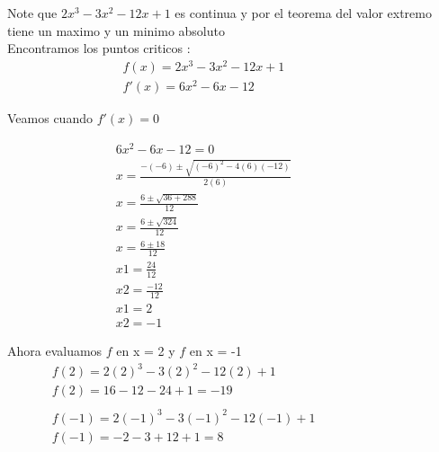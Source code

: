 \documentclass{report}
\begin{document}
{\Large\justify

Note que $ 2x^3 -3x^2 -12x + 1$ es continua y por el teorema del valor extremo
tiene un maximo y un minimo absoluto \\
Encontramos los puntos criticos :
\begin{align*}
     & f(x) = 2x^3 -3x^2 -12x + 1 &  &  &  &  &  &  & \\
     & f'(x) = 6x^2 -6x -12
\end{align*}

Veamos cuando $f'(x) = 0$

\begin{align*}                                    
     & 6x^2 -6x -12 = 0                                      &  &  &  &  &  &  & \\
     & x = \frac{ -(-6) \pm \sqrt{(-6)^2 -4(6)(-12)}} {2(6)}                     \\
     & x = \frac{ 6 \pm\sqrt{36 + 288}} { 12}                                    \\
     & x =  \frac{ 6 \pm\sqrt{324}} { 12}                                        \\
     & x = \frac{6\pm18}{12}                                                     \\
     & x1 = \frac {24}{12}                                                       \\
     & x2 = \frac{-12}{12}                                                       \\
     & x1 = 2                                                                    \\
     & x2 = -1
\end{align*}

Ahora evaluamos $f$ en x = 2 y $f$ en x = -1
\begin{align*}
     & f(2) = 2(2)^3 -3(2)^2 -12(2) + 1      &  &  &  &  &  &  &  &  &  &  & \\
     & f(2) = 16 -12 -24 +1 = -19                                                    \\\\
     & f(-1) = 2(-1)^3 -3(-1)^2 -12(-1) + 1                                          \\
     & f(-1) = -2 -3 + 12 +1 = 8                                                     \\\\\\
\end{align*}

}
\end{document}
